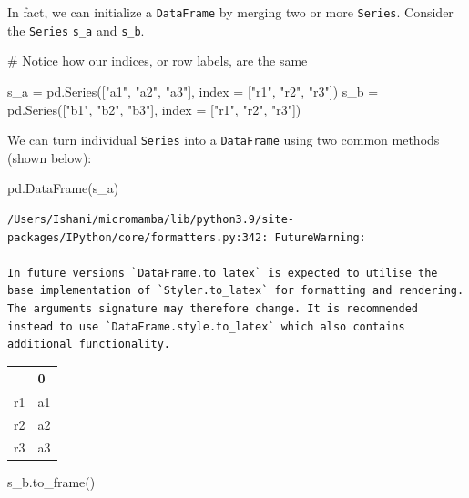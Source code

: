 \documentclass[
  letterpaper,
  DIV=11,
  numbers=noendperiod]{scrreprt}
\newenvironment{Shaded}{\begin{snugshade}}{\end{snugshade}}
\newcommand{\CommentTok}[1]{\textcolor[rgb]{0.37,0.37,0.37}{#1}}
\newcommand{\NormalTok}[1]{\textcolor[rgb]{0.00,0.23,0.31}{#1}}
\newcommand{\OperatorTok}[1]{\textcolor[rgb]{0.37,0.37,0.37}{#1}}
\newcommand{\StringTok}[1]{\textcolor[rgb]{0.13,0.47,0.30}{#1}}
\begin{document}
In fact, we can initialize a \texttt{DataFrame} by merging two or more
\texttt{Series}. Consider the \texttt{Series} \texttt{s\_a} and
\texttt{s\_b}.

\begin{Shaded}
\begin{Highlighting}[]
\CommentTok{\# Notice how our indices, or row labels, are the same}

\NormalTok{s\_a }\OperatorTok{=}\NormalTok{ pd.Series([}\StringTok{"a1"}\NormalTok{, }\StringTok{"a2"}\NormalTok{, }\StringTok{"a3"}\NormalTok{], index }\OperatorTok{=}\NormalTok{ [}\StringTok{"r1"}\NormalTok{, }\StringTok{"r2"}\NormalTok{, }\StringTok{"r3"}\NormalTok{])}
\NormalTok{s\_b }\OperatorTok{=}\NormalTok{ pd.Series([}\StringTok{"b1"}\NormalTok{, }\StringTok{"b2"}\NormalTok{, }\StringTok{"b3"}\NormalTok{], index }\OperatorTok{=}\NormalTok{ [}\StringTok{"r1"}\NormalTok{, }\StringTok{"r2"}\NormalTok{, }\StringTok{"r3"}\NormalTok{])}
\end{Highlighting}
\end{Shaded}

We can turn individual \texttt{Series} into a \texttt{DataFrame} using
two common methods (shown below):

\begin{Shaded}
\begin{Highlighting}[]
\NormalTok{pd.DataFrame(s\_a)}
\end{Highlighting}
\end{Shaded}

\begin{verbatim}
/Users/Ishani/micromamba/lib/python3.9/site-packages/IPython/core/formatters.py:342: FutureWarning:

In future versions `DataFrame.to_latex` is expected to utilise the base implementation of `Styler.to_latex` for formatting and rendering. The arguments signature may therefore change. It is recommended instead to use `DataFrame.style.to_latex` which also contains additional functionality.
\end{verbatim}

\begin{tabular}{ll}
\toprule
{} &   0 \\
\midrule
r1 &  a1 \\
r2 &  a2 \\
r3 &  a3 \\
\bottomrule
\end{tabular}

\begin{Shaded}
\begin{Highlighting}[]
\NormalTok{s\_b.to\_frame()}
\end{Highlighting}
\end{Shaded}
\end{document}
